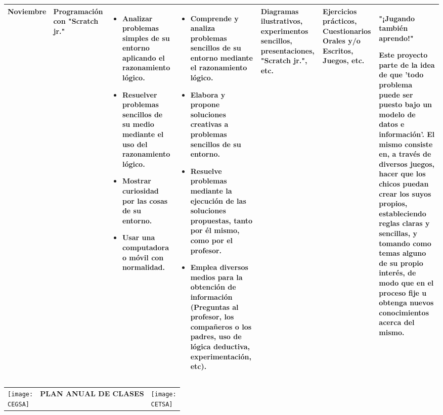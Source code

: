 \documentclass[landscape, a4paper, 10pt]{article}
\newcommand{\smallcellwidth}{0.7in}
\newcommand{\normalcellwidth}{1.2in}
\newcommand{\bigcellwidth}{2.0in}
\newcommand{\CEGSA}{cegsa-logo.png}
\newcommand{\CETSA}{cetsa-logo.png}
\begin{document}
\begin{longtable}{|m{\smallcellwidth}|p{\normalcellwidth}|p{\bigcellwidth}|p{\bigcellwidth}|p{\normalcellwidth}|p{\normalcellwidth}|p{\normalcellwidth}|}
		\hline
		Noviembre &
		Programación con "Scratch jr." &
		\begin{itemize}
			\item Analizar problemas simples de su entorno aplicando el razonamiento lógico.
			\item Resuelver problemas sencillos de su medio mediante el uso del razonamiento lógico.
			\item Mostrar curiosidad por las cosas de su entorno.
			\item Usar una computadora o móvil con normalidad.
		\end{itemize} &
		\begin{itemize}
			\item Comprende y analiza problemas sencillos de su entorno mediante el razonamiento lógico.
			\item Elabora y propone soluciones creativas a problemas sencillos de su entorno.
			\item Resuelve problemas mediante la ejecución de las soluciones propuestas, tanto por él mismo, como por el profesor.
			\item Emplea diversos medios para la obtención de información (Preguntas al profesor, los compañeros o los padres, 
			uso de lógica deductiva, experimentación, etc).
		\end{itemize} &
		Diagramas ilustrativos, experimentos sencillos, presentaciones, "Scratch jr.", etc.  &
		Ejercicios prácticos, Cuestionarios Orales y/o Escritos, Juegos, etc. &
		"¡Jugando también aprendo!"\par
		Este proyecto parte de la idea de que 'todo problema puede ser puesto bajo un modelo de datos e información'. 
		El mismo consiste en, a través de diversos juegos, hacer que los chicos puedan crear los suyos propios, estableciendo 
		reglas claras y sencillas, y tomando como temas alguno de su propio interés, de modo que en el proceso fije u obtenga 
		nuevos conocimientos acerca del mismo. \\
		\hline

	\end{longtable}
	\pagebreak[4]
	\begin{tabularx}{\textwidth}{ >{\raggedright\arraybackslash}X >{\centering\arraybackslash}X >{\raggedleft\arraybackslash}X }
		\texttt{[image: \\CEGSA]} &
		\textbf{PLAN ANUAL DE CLASES} &
		\texttt{[image: \\CETSA]}
	\end{tabularx}
\end{document}
